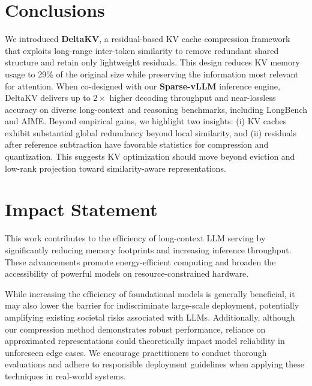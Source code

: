 \section{Conclusions}
\label{sec:conclusions}

We introduced \textbf{DeltaKV}, a residual-based KV cache compression framework that exploits long-range inter-token similarity to remove redundant shared structure and retain only lightweight residuals. This design reduces KV memory usage to 29\% of the original size while preserving the information most relevant for attention. When co-designed with our \textbf{Sparse-vLLM} inference engine, DeltaKV delivers up to $2\times$ higher decoding throughput and near-lossless accuracy on diverse long-context and reasoning benchmarks, including LongBench and AIME.
Beyond empirical gains, we highlight two insights: (i) KV caches exhibit substantial global redundancy beyond local similarity, and (ii) residuals after reference subtraction have favorable statistics for compression and quantization. 
This suggests KV optimization should move beyond eviction and low-rank projection toward similarity-aware representations.




\section*{Impact Statement}
This work contributes to the efficiency of long-context LLM serving by significantly reducing memory footprints and increasing inference throughput. These advancements promote energy-efficient computing and broaden the accessibility of powerful models on resource-constrained hardware.

While increasing the efficiency of foundational models is generally beneficial, it may also lower the barrier for indiscriminate large-scale deployment, potentially amplifying existing societal risks associated with LLMs. Additionally, although our compression method demonstrates robust performance, reliance on approximated representations could theoretically impact model reliability in unforeseen edge cases. We encourage practitioners to conduct thorough evaluations and adhere to responsible deployment guidelines when applying these techniques in real-world systems.

